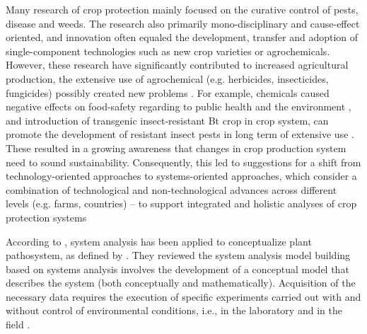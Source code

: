 

Many research of crop protection mainly focused on the curative control of pests, disease and weeds. The research also primarily mono-disciplinary and cause-effect oriented, and innovation often equaled the development, transfer and adoption of single-component technologies such as new crop varieties or agrochemicals. However, these research have significantly contributed to increased agricultural production, the extensive use of agrochemical (e.g. herbicides, insecticides, fungicides) possibly created new problems \citep{schut2014}. For example, chemicals caused negative effects on food-safety regarding to public health and the environment \citep{ying1999herbicide}, and introduction of transgenic insect-resistant Bt crop in crop system, can promote the development of resistant insect pests in long term of extensive use \citep{dale2002potential}. These resulted in a growing awareness that changes in crop production system need to sound sustainability. Consequently, this led to suggestions for a shift from technology-oriented approaches to systems-oriented approaches, which consider a combination of technological and non-technological advances across different levels (e.g. farms, countries) – to support integrated and holistic analyses of crop protection systems \cite{Savary:2012bi}

According to \cite{kranz1980systems}, system analysis has been applied to conceptualize plant pathosystem, as defined by \cite{robinson1976plant}. They reviewed the system analysis model building based on systems analysis involves the development of a conceptual model that describes the system (both conceptually and mathematically). Acquisition of the necessary data requires the execution of specific experiments carried out with and without control of environmental conditions, i.e., in the laboratory and in the field \citep{kranz1980systems}. 

